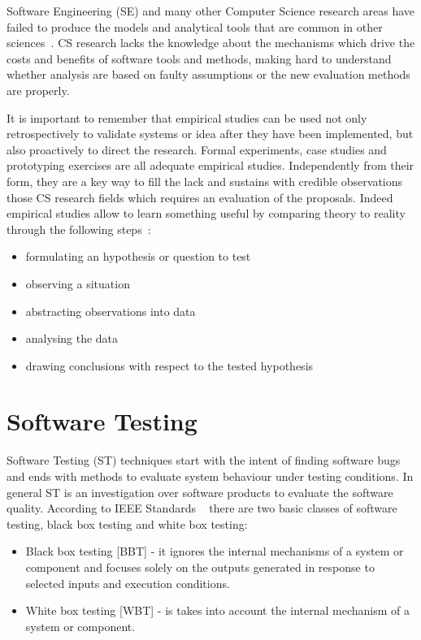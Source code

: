 Software Engineering (SE) and many other Computer Science research areas have failed to produce the models and analytical tools that are common in other sciences~\cite{Perry:2000:ESS:336512.336586}. CS research lacks the knowledge about the mechanisms which drive the costs and benefits of software tools and methods, making hard to understand whether analysis are based on faulty assumptions or the new evaluation methods are properly.

It is important to remember that empirical studies can be used not only retrospectively to validate systems or idea after they have been implemented, but also proactively to direct the research. Formal experiments, case studies and prototyping exercises are all adequate empirical studies. Independently from their form, they are a key way to fill the lack and sustains with credible observations those CS research fields which requires an evaluation of the proposals. Indeed empirical studies allow to learn something useful by comparing theory to reality through the following steps~\cite{Perry:2000:ESS:336512.336586}:
\begin{itemize}
\item  formulating an hypothesis or question to test
\item  observing a situation
\item  abstracting observations into data
\item  analysing the data
\item  drawing conclusions with respect to the tested hypothesis
\end{itemize}
\pagebreak

\section{Software Testing}\label{sec:software-testing}
Software Testing (ST) techniques start with the intent of finding software bugs and ends with methods to evaluate system behaviour under testing conditions. In general ST is an investigation over software products to evaluate the software quality. According to IEEE Standards ~\cite{IEEEStd610.12-1990:glossary} there are two basic classes of software testing, black box testing and white box testing: 

\begin{itemize}
\item Black box testing [BBT] - it ignores the internal mechanisms of a system or component and focuses solely on the outputs
generated in response to selected inputs and execution conditions.
\item White box testing [WBT] - is takes into account the internal mechanism of a system or component. 
\end{itemize} 

